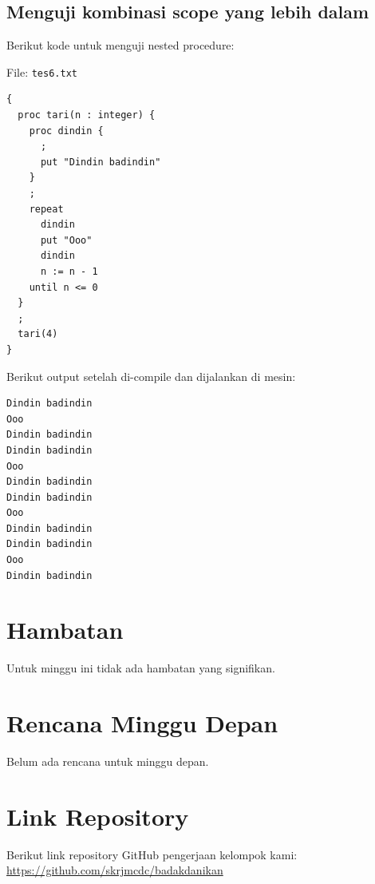 \documentclass[11pt,a4paper]{article}
\begin{document}
\subsection{Menguji kombinasi scope yang lebih dalam}

Berikut kode untuk menguji nested procedure:


File: \texttt{tes6.txt}
\begin{verbatim}
{
  proc tari(n : integer) {
    proc dindin {
      ;
      put "Dindin badindin"
    }
    ;
    repeat
      dindin
      put "Ooo"
      dindin
      n := n - 1
    until n <= 0
  }
  ;
  tari(4)
}
\end{verbatim}

Berikut output setelah di-compile dan dijalankan di mesin:

\begin{verbatim}
Dindin badindin
Ooo
Dindin badindin
Dindin badindin
Ooo
Dindin badindin
Dindin badindin
Ooo
Dindin badindin
Dindin badindin
Ooo
Dindin badindin
\end{verbatim}

\section{Hambatan}

Untuk minggu ini tidak ada hambatan yang signifikan.

\section{Rencana Minggu Depan}

Belum ada rencana untuk minggu depan.

\appendix
\section{Link Repository}

Berikut link repository GitHub pengerjaan kelompok kami: \url{https://github.com/skrjmcdc/badakdanikan}
\end{document}
